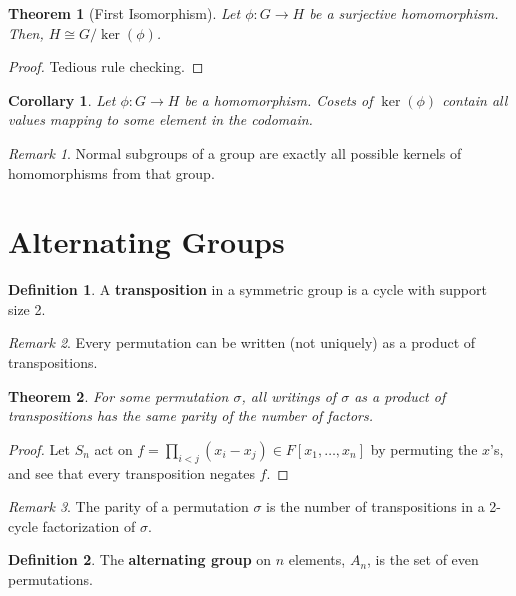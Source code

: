 \documentclass[
    parskip=half,
    toc=flat,
    toc=sectionentrydotfill,
]{scrartcl}  %
\theoremstyle{definition}
\newtheorem{definition}{Definition}[section]
\theoremstyle{plain}
\newtheorem{theorem}{Theorem}[section]
\newtheorem{corollary}{Corollary}[theorem]
\theoremstyle{remark}
\newtheorem{remark}{Remark}[section]
\begin{document}
\begin{theorem}[First Isomorphism]
    Let $\phi:G\to H$ be a surjective homomorphism.
    Then, $H\cong G/\ker(\phi)$.
\end{theorem}

\begin{proof}
    Tedious rule checking.
\end{proof}

\begin{corollary}
    Let $\phi:G\to H$ be a homomorphism.
    Cosets of $\ker(\phi)$ contain all values mapping to some element in the codomain.
\end{corollary}

\begin{remark}
    Normal subgroups of a group are exactly all possible kernels of homomorphisms from that group.
\end{remark}


\section{Alternating Groups}

\begin{definition}
    A \textbf{transposition} in a symmetric group is a cycle with support size 2.
\end{definition}

\begin{remark}
    Every permutation can be written (not uniquely) as a product of transpositions.
\end{remark}

\begin{theorem}
    For some permutation $\sigma$, all writings of $\sigma$ as a product of transpositions has the same parity of the
    number of factors.
\end{theorem}

\begin{proof}
    Let $S_n$ act on $f=\prod_{i<j}(x_i-x_j)\in F[x_1,\dots,x_n]$ by permuting the $x$'s, and see that every
    transposition negates $f$.
\end{proof}

\begin{remark}
    The parity of a permutation $\sigma$ is the number of transpositions in a 2-cycle factorization of $\sigma$.
\end{remark}

\begin{definition}
    The \textbf{alternating group} on $n$ elements, $A_n$, is the set of even permutations.
\end{definition}
\end{document}
